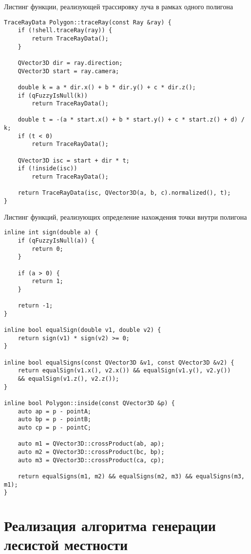 \newpage
\begin{code}
\caption{Листинг функции, реализующей трассировку луча в рамках одного полигона}
\label{lst:3}
\begin{verbatim}
TraceRayData Polygon::traceRay(const Ray &ray) {
    if (!shell.traceRay(ray)) {
        return TraceRayData();
    }

    QVector3D dir = ray.direction;
    QVector3D start = ray.camera;

    double k = a * dir.x() + b * dir.y() + c * dir.z();
    if (qFuzzyIsNull(k))
        return TraceRayData();

    double t = -(a * start.x() + b * start.y() + c * start.z() + d) / k;
    if (t < 0)
        return TraceRayData();

    QVector3D isc = start + dir * t;
    if (!inside(isc))
        return TraceRayData();

    return TraceRayData(isc, QVector3D(a, b, c).normalized(), t);
}
\end{verbatim}
\end{code}

\newpage
\begin{code}
\caption{Листинг функций, реализующих определение нахождения точки внутри полигона}
\label{lst:4}
\begin{verbatim}
inline int sign(double a) {
    if (qFuzzyIsNull(a)) {
        return 0;
    }

    if (a > 0) {
        return 1;
    }

    return -1;
}

inline bool equalSign(double v1, double v2) {
    return sign(v1) * sign(v2) >= 0;
}

inline bool equalSigns(const QVector3D &v1, const QVector3D &v2) {
    return equalSign(v1.x(), v2.x()) && equalSign(v1.y(), v2.y()) 
    && equalSign(v1.z(), v2.z());
}

inline bool Polygon::inside(const QVector3D &p) {
    auto ap = p - pointA;
    auto bp = p - pointB;
    auto cp = p - pointC;

    auto m1 = QVector3D::crossProduct(ab, ap);
    auto m2 = QVector3D::crossProduct(bc, bp);
    auto m3 = QVector3D::crossProduct(ca, cp);

    return equalSigns(m1, m2) && equalSigns(m2, m3) && equalSigns(m3, m1);
}
\end{verbatim}
\end{code}

\section{Реализация алгоритма генерации лесистой местности}


